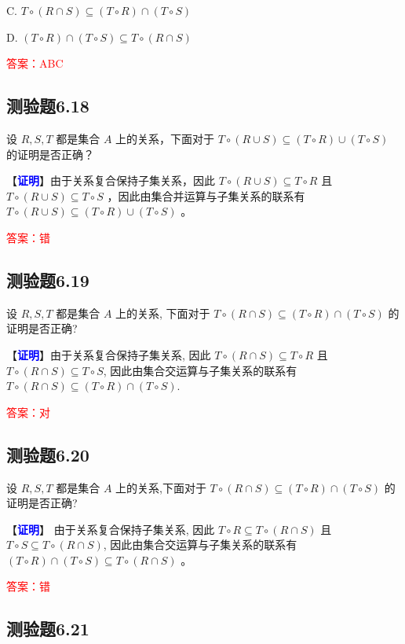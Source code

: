 \documentclass[UTF8, heading=true]{ctexart}
\begin{document}
C. $T \circ (R \cap S) \subseteq (T \circ R) \cap (T \circ S)$

D. $(T \circ R) \cap (T \circ S) \subseteq T \circ (R \cap S)$


\textcolor{red}{答案：ABC}

\subsection{测验题6.18}

设 $R, S, T$ 都是集合 $A$ 上的关系，下面对于 $T \circ(R \cup S) \subseteq(T \circ R) \cup(T \circ S)$ 的证明是否正确？

【\textbf{\textcolor{blue}{证明}}】由于关系复合保持子集关系，因此 $T \circ(R \cup S) \subseteq T \circ R$ 且 $T \circ(R \cup S) \subseteq T \circ S$ ，因此由集合并运算与子集关系的联系有 $T \circ(R \cup S) \subseteq(T \circ R) \cup(T \circ S)$ 。

\textcolor{red}{答案：错}

\subsection{测验题6.19}

设 $R, S, T$ 都是集合 $A$ 上的关系, 下面对于 $T \circ(R \cap S) \subseteq(T \circ R) \cap(T \circ S)$ 的证明是否正确?

【\textcolor{blue}{\textbf{证明}}】由于关系复合保持子集关系, 因此 $T \circ(R \cap S) \subseteq T \circ R$ 且 $T \circ(R \cap S) \subseteq T \circ S$, 因此由集合交运算与子集关系的联系有 $T \circ(R \cap S) \subseteq(T \circ R) \cap(T \circ S)$.

\textcolor{red}{答案：对}

\subsection{测验题6.20}
设 $R, S, T$ 都是集合 $A$ 上的关系,下面对于 $T \circ(R \cap S) \subseteq(T \circ R) \cap(T \circ S)$ 的证明是否正确?

【\textcolor{blue}{\textbf{证明}}】 由于关系复合保持子集关系, 因此 $T \circ R \subseteq T \circ(R \cap S)$ 且 $T \circ S \subseteq T \circ(R \cap S)$, 因此由集合交运算与子集关系的联系有 $(T \circ R) \cap(T \circ S) \subseteq T \circ(R \cap S)$ 。

\textcolor{red}{答案：错}

\subsection{测验题6.21}
\end{document}
